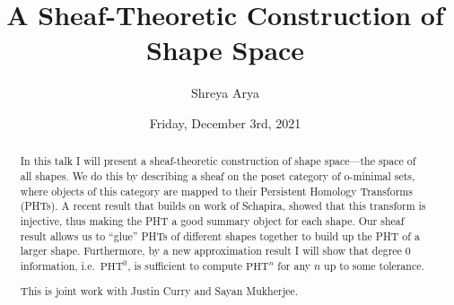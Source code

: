 \documentclass{UAmathtalk}
\author{Shreya Arya}
\title{A Sheaf-Theoretic Construction of \\ Shape Space}
\date{Friday, December 3rd, 2021}
\begin{document}
\maketitle


\begin{abstract}
In this talk I will present a sheaf-theoretic construction of shape space---the space of all shapes. We do this by describing a sheaf on the poset category of o-minimal sets, where objects of this category are mapped to their Persistent Homology Transforms (PHTs). A recent result that builds on work of Schapira, showed that this transform is injective, thus making the PHT a good summary object for each shape. Our sheaf result allows us to ``glue'' PHTs of different shapes together to build up the PHT of a larger shape. Furthermore, by a new approximation result I will show that degree 0 information, i.e.~$\text{PHT}^0$, is sufficient to compute $\text{PHT}^n$ for any $n$ up to some tolerance. 

This is joint work with Justin Curry and Sayan Mukherjee.
\end{abstract}
\end{document}
